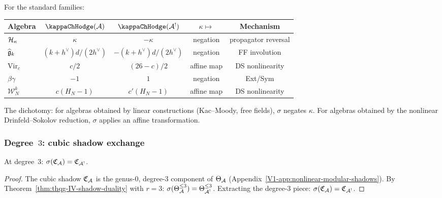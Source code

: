 \begin{computation}
For the standard families:
\begin{center}
\renewcommand{\arraystretch}{1.3}
\begin{tabular}{lcccc}
\toprule
\textbf{Algebra} & $\kappaChHodge(\cA)$ & $\kappaChHodge(\cA^!)$ &
$\kappa \mapsto$ & Mechanism \\
\midrule
$\mathcal{H}_\kappa$ & $\kappa$ & $-\kappa$ & negation & propagator reversal \\
$\widehat{\mathfrak{g}}_k$ & $(k{+}h^\vee)d/(2h^\vee)$ &
$-(k{+}h^\vee)d/(2h^\vee)$ & negation & FF involution \\
$\mathrm{Vir}_c$ & $c/2$ & $(26{-}c)/2$ & affine map &
DS nonlinearity \\
$\beta\gamma$ & $-1$ & $1$ & negation & Ext/Sym \\
$\mathcal{W}_N^k$ & $c(H_N{-}1)$ & $c'(H_N{-}1)$ & affine map &
DS nonlinearity \\
\bottomrule
\end{tabular}
\end{center}
The dichotomy: for algebras obtained by linear constructions
(Kac--Moody, free fields), $\sigma$ negates $\kappa$. For algebras
obtained by the nonlinear Drinfeld--Sokolov reduction, $\sigma$ applies
an affine transformation.
\end{computation}

\subsubsection{Degree~$3$: cubic shadow exchange}

\begin{proposition}
At degree~$3$:
$\sigma(\mathfrak{C}_{\mathcal{A}}) = \mathfrak{C}_{\mathcal{A}^!}$.
\end{proposition}

\begin{proof}
The cubic shadow $\mathfrak{C}_{\mathcal{A}}$ is the genus-$0$, degree-$3$
component of $\Theta_{\mathcal{A}}$ (Appendix~\ref*{V1-app:nonlinear-modular-shadows}).
By Theorem~\ref{thm:thqg-IV-shadow-duality} with $r = 3$:
$\sigma(\Theta_{\mathcal{A}}^{\leq 3}) = \Theta_{\mathcal{A}^!}^{\leq 3}$.
Extracting the degree-$3$ piece:
$\sigma(\mathfrak{C}_{\mathcal{A}}) = \mathfrak{C}_{\mathcal{A}^!}$.
\end{proof}

